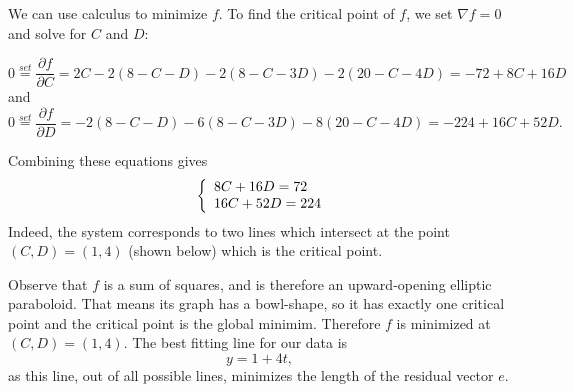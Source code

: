 \documentclass[10pt]{article}
\theoremstyle{definition}
\newcommand{\1}[1]{\textbf{1}_{\left[#1\right]}} %
\newcommand{\demph}[1]{\textcolor{RoyalBlue}{\textbf{\slshape #1}}} %
\begin{document}
We can use calculus to minimize $f$. To find the critical point of $f$, we set
$\nabla f=0$ and solve for $C$ and $D$:

\begin{equation*}
  0\overset{set}{=}\frac{\partial f}{\partial C} = 2C-2(8-C-D)-2(8-C-3D)-2(20-C-4D) =-72+8C+16D
\end{equation*}
and
\begin{equation*}
  0\overset{set}{=}\frac{\partial f}{\partial D} = -2(8-C-D)-6(8-C-3D)-8(20-C-4D) = -224+16C+52D.
\end{equation*}

Combining these equations gives
\begin{equation}\label{eq:31}
  \left\{ \begin{array}{l@{}l}  8C+16D=72\\16C+52D=224  \end{array}\right.
\end{equation}
Indeed, the system corresponds to two lines which intersect
at the point $(C,D)=(1,4)$ (shown below) which is the critical point.
\begin{center}
\end{center}
Observe that $f$ is a sum of squares, and is therefore an upward-opening
elliptic paraboloid. That means its graph has a bowl-shape, so it has exactly
one critical point and the critical point is the global minimim. Therefore $f$
is minimized at $(C,D)=(1,4)$. The best fitting line for our data is
\begin{equation*}
  y=1+4t,
\end{equation*}
as this line, out of all possible lines, minimizes the length of the residual
vector $e$.
\end{document}
